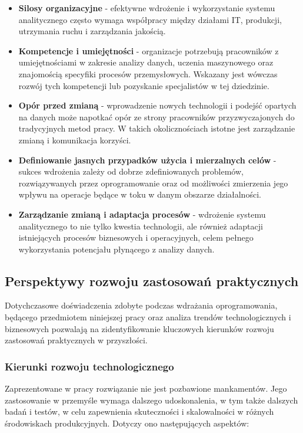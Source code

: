 \begin{itemize}
    \item \textbf{Silosy organizacyjne} - efektywne wdrożenie i wykorzystanie systemu analitycznego często wymaga współpracy między działami IT, produkcji, utrzymania ruchu i zarządzania jakością.
    \item \textbf{Kompetencje i umiejętności} - organizacje potrzebują pracowników z umiejętnościami w zakresie analizy danych, uczenia maszynowego oraz znajomością specyfiki procesów przemysłowych. Wskazany jest wówczas rozwój tych kompetencji lub pozyskanie specjalistów w tej dziedzinie.
    \item \textbf{Opór przed zmianą} - wprowadzenie nowych technologii i podejść opartych na danych może napotkać opór ze strony pracowników przyzwyczajonych do tradycyjnych metod pracy. W takich okolicznościach istotne jest zarządzanie zmianą i komunikacja korzyści.
    \item \textbf{Definiowanie jasnych przypadków użycia i mierzalnych celów} - sukces wdrożenia zależy od dobrze zdefiniowanych problemów, rozwiązywanych przez oprogramowanie oraz od możliwości zmierzenia jego wpływu na operacje będące w toku w danym obszarze działalności.
    \newpage
    \item \textbf{Zarządzanie zmianą i adaptacja procesów} - wdrożenie systemu analitycznego to nie tylko kwestia technologii, ale również adaptacji istniejących procesów biznesowych i operacyjnych, celem pełnego wykorzystania potencjału płynącego z analizy danych.
\end{itemize}

\subsection{Perspektywy rozwoju zastosowań praktycznych}
\label{subsec:perspektywy_rozwoju}

Dotychczasowe doświadczenia zdobyte podczas wdrażania oprogramowania, będącego przedmiotem niniejszej pracy oraz analiza trendów technologicznych i biznesowych pozwalają na zidentyfikowanie kluczowych kierunków rozwoju zastosowań praktycznych w przyszłości.

\subsubsection{Kierunki rozwoju technologicznego}
\label{subsubsec:kierunki_rozwoju_tech}

Zaprezentowane w pracy rozwiązanie nie jest pozbawione mankamentów. Jego zastosowanie w przemyśle wymaga dalszego udoskonalenia, w tym także dalszych badań i testów, w celu zapewnienia skuteczności i skalowalności w różnych środowiskach produkcyjnych. Dotyczy ono następujących aspektów:

